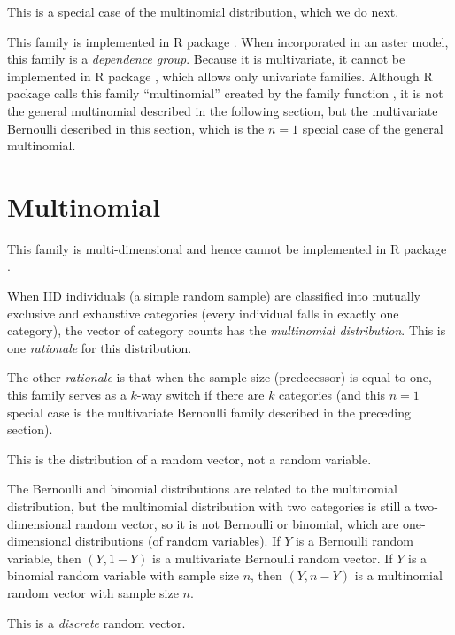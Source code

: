 This is a special case of the multinomial distribution, which we do next.

This family is implemented in R package .
When incorporated in an aster model, this family is a \emph{dependence group}.
Because it is
multivariate, it cannot be implemented in R package ,
which allows only univariate families.  Although R package 
calls this family ``multinomial'' created by the family function
, it is not the general multinomial described in
the following section, but the multivariate Bernoulli described in this
section, which is the $n = 1$ special case of the general multinomial.

\section{Multinomial}
\label{app:sec:multinomial}

This family is multi-dimensional and hence cannot be implemented in R package
.

When IID individuals (a simple random sample) are classified into mutually
exclusive and exhaustive categories (every individual falls in exactly one
category), the vector of category counts has
the \emph{multinomial distribution}.
This is one \emph{rationale} for this distribution.

The other \emph{rationale} is that when the sample size (predecessor)
is equal to one, this family serves as a $k$-way switch if there are $k$
categories
(and this $n = 1$ special case is the multivariate Bernoulli family
described in the preceding section).

This is the distribution of a random vector, not a random variable.

The Bernoulli and binomial distributions are related to the multinomial
distribution, but the multinomial distribution with two categories is
still a two-dimensional random vector, so it is not Bernoulli or binomial,
which are one-dimensional distributions (of random variables).
If $Y$ is a Bernoulli random variable, then
$(Y, 1 - Y)$ is a multivariate Bernoulli random vector.
If $Y$ is a binomial random variable with sample size $n$, then
$(Y, n - Y)$ is a multinomial random vector with sample size $n$.

This is a \emph{discrete} random vector.

